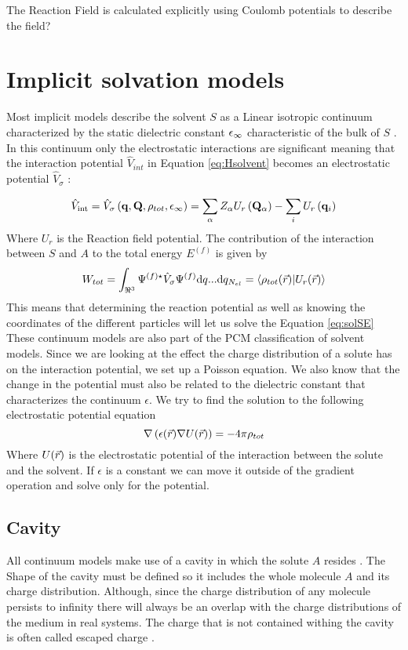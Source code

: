 \documentclass[../master_thesis.tex]{subfiles}
\begin{document}
The Reaction Field is calculated explicitly using Coulomb potentials to describe
the field?

\section{Implicit solvation models}
Most implicit models describe the solvent $S$ as a Linear isotropic continuum
characterized by the static dielectric constant $\epsilon_{\infty}$ characteristic
of the bulk of $S$ \cite{Tomasi:1994wt, FossoTande:2013ka}. In this continuum
only the electrostatic interactions are significant \cite{Tomasi:1994wt} meaning
that the interaction potential $\hat{V}_{int}$ in Equation \ref{eq:Hsolvent}
becomes an electrostatic potential $\hat{V}_{\sigma}$ \cite{Tomasi:1994wt}:

\begin{equation}
  \hat{V}_{\mathrm{int}}=\hat{V}_{\sigma}\left(\mathbf{q}, \mathbf{Q},
  \rho_{tot}, \epsilon_{\infty}\right)=\sum_{\alpha} Z_{\alpha} U_r
  \left(\mathbf{Q}_{\alpha}\right)-\sum_{i} U_r\left(\mathbf{q}_{i}\right)
\end{equation}
Where $U_r$ is the Reaction field potential.
The contribution of the interaction between $S$ and $A$ to the total energy
$E^{(f)}$ is given by
\begin{equation}
  W_{tot} = \int_{\real^3}\Psi^{(f)\star}\hat{V}_{\sigma}\Psi^{(f)}\text{d}q...\text{d}q_{N_{el}}
  = \braket{\rho_{tot}(\rvec)|U_r(\rvec)}
\end{equation}
This means that determining the reaction potential as well as knowing the coordinates
of the different particles will let us solve the Equation \ref{eq:solSE}
These continuum models are also part of the \ac{PCM} classification of solvent
models.
Since we are looking at the effect the charge distribution of a solute has on
the interaction potential, we set up a Poisson equation. We also know that the change in
the potential must also be related to the dielectric constant that characterizes
the continuum $\epsilon$. We try to find the solution to the following
electrostatic potential equation
\begin{equation}
  \nabla\left( \epsilon(\vec{r}) \nabla U(\vec{r})\right) = -4\pi\rho_{tot}
\end{equation}
Where $U(\vec{r})$ is the electrostatic potential of the interaction between
the solute and the solvent. If $\epsilon$ is a constant we can move it outside
of the gradient operation and solve only for the potential.

\subsection{Cavity}\label{Cavitytitle}
All continuum models make use of a cavity in which the solute $A$ resides
\cite{Tomasi:1994wt, Cramer:2004, Tomasi:2005ipa}. The Shape of the cavity
must be defined so it includes the whole molecule $A$ and its charge distribution.
Although, since the charge distribution of any molecule persists to infinity there
will always be an overlap with the charge distributions of the medium in real
systems. The charge that is not contained withing the cavity is often called
escaped charge \cite{Tomasi:2005ipa}.
\end{document}
